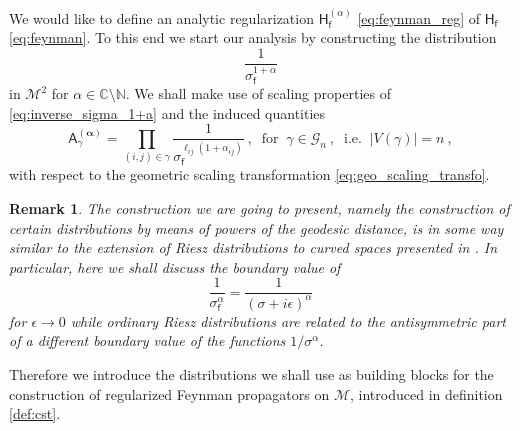 \documentclass[11pt]{book}
\newcommand{\alphabd}{\boldsymbol{\alpha}}
\newcommand{\abs}[1]{\left|#1\right|}
\newcommand{\Gcal}{\mathcal{G}}
\newcommand{\Mcal}{\mathcal{M}}
\newcommand{\Cbb}{\mathbb{C}}
\newcommand{\Nbb}{\mathbb{N}}
\newcommand{\Asf}{\mathsf{A}}
\newcommand{\Hsf}{\mathsf{H}}
\newcommand{\fsf}{\mathsf{f}}
\theoremstyle{break}
\newtheorem{remark}{Remark}[chapter]
\begin{document}
We would like to define an analytic regularization $\Hsf^{(\alpha)}_\fsf$ \eqref{eq:feynman_reg} of $\Hsf_\fsf$ \eqref{eq:feynman}. To this end we start our analysis by constructing the distribution 
%
\begin{equation}
\frac{1}{\sigma_\fsf^{1+\alpha}}
\label{eq:inverse_sigma_1+a}
\end{equation}
%
in $\Mcal^2$ for $\alpha \in \Cbb \setminus \Nbb$. We shall make use of scaling properties of \eqref{eq:inverse_sigma_1+a} and the induced quantities 
%
\begin{equation}
\Asf_\gamma^{(\alphabd)} = \prod_{(i,j)\in\gamma} \frac{1}{\sigma_\fsf^{\ell_{ij}(1+\alpha_{ij})}} \ , \ \mbox{ for } \ \gamma \in \Gcal_n \ , \ \mbox{ i.e. } \ \abs{V(\gamma)}=n \ ,
\label{eq:amplitude_sigma_reg}
\end{equation}
%
with respect to the geometric scaling transformation \eqref{eq:geo_scaling_transfo}. 

\begin{remark}
The construction we are going to present, namely the construction of certain distributions by means of powers of the geodesic distance, is in some way similar to the extension of Riesz distributions to curved spaces presented in \cite{BGP_2007}. In particular, here we shall discuss the boundary value of 
%
\begin{equation*}
\frac{1}{\sigma_\fsf^\alpha} = \frac{1}{(\sigma+i\epsilon)^{\alpha}} 
\end{equation*}
%
for $\epsilon\to0$ while ordinary Riesz distributions are related to the antisymmetric part of a different boundary value of the functions $1/\sigma^\alpha$.
\end{remark}


Therefore we introduce the distributions we shall use as building blocks for the construction of regularized Feynman propagators on $\Mcal$, introduced in definition \ref{def:cst}. 
\end{document}
